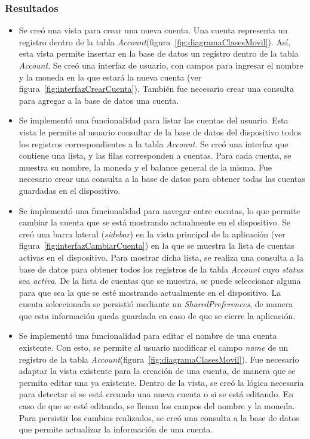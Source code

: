 \subsubsection{Resultados}
\begin{itemize}

\item Se creó una vista para crear una nueva cuenta. Una cuenta representa un registro dentro de la tabla \textit{Account}(figura~\ref{fig:diagramaClasesMovil}). Así, esta vista permite insertar en la base de datos un registro dentro de la tabla \textit{Account}. Se creó una interfaz de usuario, con campos para ingresar el nombre y la moneda en la que estará la nueva cuenta (ver figura~\ref{fig:interfazCrearCuenta}). También fue necesario crear una consulta para agregar a la base de datos una cuenta.
\item Se implementó una funcionalidad para listar las cuentas del usuario. Esta vista le permite al usuario consultar de la base de datos del dispositivo todos los registros correspondientes a la tabla \textit{Account}. Se creó una interfaz que contiene una lista, y las filas corresponden a cuentas. Para cada cuenta, se muestra su nombre, la moneda y el balance general de la misma. Fue necesario crear una consulta a la base de datos para obtener todas las cuentas guardadas en el dispositivo.
\item Se implementó una funcionalidad para navegar entre cuentas, lo que permite cambiar la cuenta que se está mostrando actualmente en el dispositivo. Se creó una barra lateral (\textit{sidebar}) en la vista principal de la aplicación (ver figura~\ref{fig:interfazCambiarCuenta}) en la que se muestra la lista de cuentas activas en el dispositivo. Para mostrar dicha lista, se realiza una consulta a la base de datos para obtener todos los registros de la tabla \textit{Account} cuyo \textit{status} sea \textit{activa}. De la lista de cuentas que se muestra, se puede seleccionar alguna para que sea la que se esté mostrando actualmente en el dispositivo. La cuenta seleccionada se persistió mediante un \textit{SharedPreferences}, de manera que esta información queda guardada en caso de que se cierre la aplicación.
\item Se implementó una funcionalidad para editar el nombre de una cuenta existente. Con esto, se permite al usuario modificar el campo \textit{name} de un registro de la tabla \textit{Account}(figura~\ref{fig:diagramaClasesMovil}). Fue necesario adaptar la vista existente para la creación de una cuenta, de manera que se permita editar una ya existente. Dentro de la vista, se creó la lógica necesaria para detectar si se está creando una nueva cuenta o si se está editando. En caso de que se esté editando, se llenan los campos del nombre y la moneda. Para persistir los cambios realizados, se creó una consulta a la base de datos que permite actualizar la información de una cuenta. 

\end{itemize}
